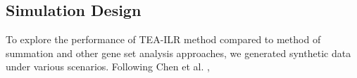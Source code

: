 \documentclass{article}
\begin{document}
\subsection{Simulation Design}
To explore the performance of TEA-ILR method compared to method of summation and other gene set analysis approaches, we generated synthetic data under various scenarios. Following Chen et al. \cite{chen2018a}, 


\newpage
{}

\end{document}
